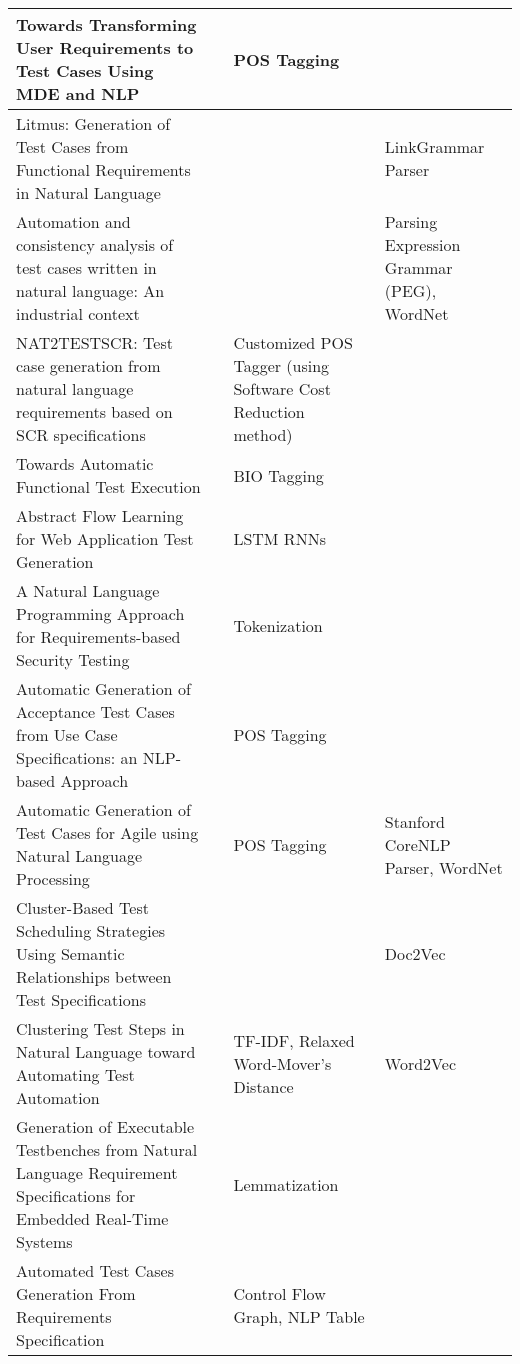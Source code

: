 \begin{longtable}{|p{4cm}|p{2.5cm}|p{4cm}|p{4cm}|}
            \hline Towards Transforming User Requirements to Test Cases Using MDE and NLP & \cite{allala2019towards} &  POS Tagging & \\
            \hline Litmus: Generation of Test Cases from Functional Requirements in Natural Language  & \cite{litmus} &  & LinkGrammar Parser\\
            \hline Automation and consistency analysis of test cases written in natural language: An industrial context & \cite{arruda2020automation} &   & Parsing Expression Grammar (PEG), WordNet\\
            \hline NAT2TESTSCR: Test case generation from natural language requirements based on SCR specifications  & \cite{carvalho2014nat2testscr} &  Customized POS Tagger (using Software Cost Reduction method) & \\
            \hline Towards Automatic Functional Test Execution & \cite{pedemonte2012towards} & BIO Tagging & \\
            \hline Abstract Flow Learning for Web Application Test Generation  & \cite{10.1145/3278186.3278194} & LSTM RNNs & \\
            \hline A Natural Language Programming Approach for Requirements-based Security Testing & \cite{mai2018natural} & Tokenization & \\
            \hline Automatic Generation of Acceptance Test Cases from Use Case Specifications: an NLP-based Approach & \cite{wang2020automatic} &  POS Tagging & \\
            \hline Automatic Generation of Test Cases for Agile using Natural Language Processing & \cite{rane2017automatic} & POS Tagging & Stanford CoreNLP Parser, WordNet\\
            \hline Cluster-Based Test Scheduling Strategies Using Semantic Relationships between Test Specifications & \cite{10.1145/3195538.3195540} &   & Doc2Vec\\
            \hline Clustering Test Steps in Natural Language toward Automating Test Automation & \cite{10.1145/3368089.3417067} & TF-IDF, Relaxed Word-Mover's Distance & Word2Vec\\
            \hline Generation of Executable Testbenches from Natural Language Requirement Specifications for Embedded Real-Time Systems & \cite{mueller2010generation} & Lemmatization & \\
            \hline Automated Test Cases Generation From Requirements Specification  & \cite{9491761} & Control Flow Graph, NLP Table & \\

\end{longtable}
